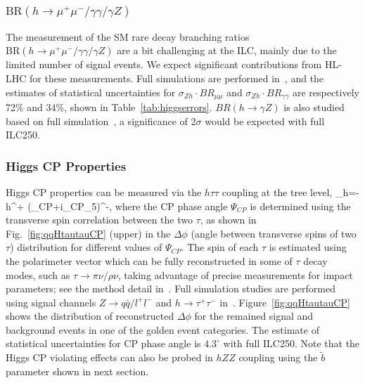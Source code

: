 \subsubsection{$\mathrm{BR}(h\to \mu^+\mu^- / \gamma\gamma / \gamma Z)$}
The measurement of the SM rare decay branching ratios
$\mathrm{BR}(h\to \mu^+\mu^- / \gamma\gamma / \gamma Z)$
are a bit challenging at the ILC, mainly due to the limited number of signal events. 
We expect significant contributions from HL-LHC for these measurements.
Full simulations are performed in~\cite{Kawada:2018wyz,Calancha:2013}, 
and the estimates of statistical uncertainties for
$\sigma_{Zh}\cdot BR_{\mu\mu}$ and $\sigma_{Zh}\cdot BR_{\gamma\gamma}$
are respectively 72\% and 34\%, shown in Table~\ref{tab:higgserrors}. 
$BR(h\to\gamma Z)$ is also studied based on full simulation~\cite{Fujii:2018}, 
a significance of 2$\sigma$ would be expected with full ILC250.

\subsubsection{Higgs CP Properties}
\label{subsubsec:higgstautauCP}
Higgs CP properties can be measured via the
$h\tau\tau$ coupling at the tree level, 
\beq
{}_{h\tau\tau}=-h{\tau^+}
(\cos\Psi_{CP}+i\sin\Psi_{CP}\gamma_5)\tau^-,
where the CP phase angle $\Psi_{CP}$ is determined using the transverse spin
correlation between the two $\tau$, as shown in Fig.~\ref{fig:qqHtautauCP} (upper)
in the $\Delta\phi$ (angle between transverse spins of two $\tau$)
distribution for different values of $\Psi_{CP}$. 
The spin of each $\tau$ is estimated using
the polarimeter vector which can be fully reconstructed in some of $\tau$ decay modes,
such as $\tau\to\pi\nu/\rho\nu$,
taking advantage of precise measurements for impact parameters; see the method detail
in~\cite{Jeans:2015vaa}. Full simulation studies are performed using signal channels 
$Z\to q\bar{q}/l^+l^-$ and $h\to \tau^+\tau^-$ in~\cite{Jeans:2018anq}. 
Figure~\ref{fig:qqHtautauCP} shows the distribution of reconstructed $\Delta\phi$
for the remained signal and background events in one of the golden event categories. 
The estimate of statistical uncertainties for CP phase angle is $4.3^\circ$ with full ILC250.
Note that the Higgs CP violating effects can also be probed in $hZZ$ coupling using the
$\tilde{b}$ parameter shown in next section.

